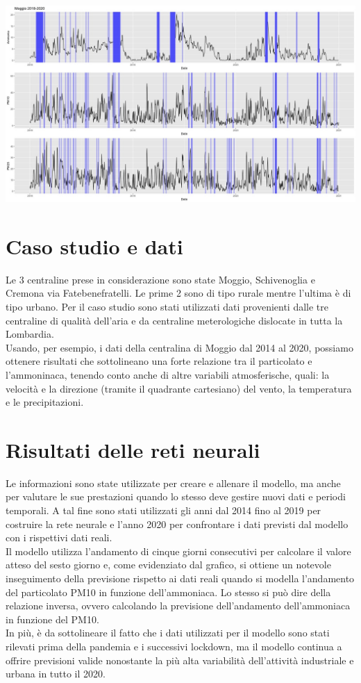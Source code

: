 \documentclass{article}
\begin{document}
\\\includegraphics[scale=0.4]{Immagini/Moggio 2018-2020.jpeg}
    
\section{Caso studio e dati}

Le 3 centraline prese in considerazione sono state Moggio, Schivenoglia e 
Cremona via Fatebenefratelli. Le prime 2 sono di tipo rurale mentre l'ultima è di tipo urbano.
Per il caso studio sono stati utilizzati dati provenienti dalle 
tre centraline di qualità dell'aria e da centraline meterologiche dislocate in tutta la Lombardia.
\\Usando, per esempio, i dati della centralina di Moggio dal 2014 al 2020, possiamo ottenere risultati 
che sottolineano una forte relazione tra il particolato e l'ammoninaca, tenendo conto anche di altre variabili
atmosferische, quali: la velocità e la direzione (tramite il quadrante cartesiano) del vento, la temperatura e le precipitazioni.
\section{Risultati delle reti neurali}
Le informazioni sono state utilizzate per creare e allenare il modello, ma anche per valutare le sue prestazioni quando lo stesso deve gestire nuovi dati e periodi temporali. A tal fine sono stati utilizzati gli anni dal 2014 fino al 2019 per costruire la rete neurale e l’anno 2020 per confrontare i dati previsti dal modello con i rispettivi dati reali.
\\Il modello utilizza l’andamento di cinque giorni consecutivi per calcolare il valore atteso del sesto giorno e, come evidenziato dal grafico, si ottiene un notevole inseguimento della previsione rispetto ai dati reali quando si modella l’andamento del particolato PM10 in funzione dell’ammoniaca. Lo stesso si può dire della relazione inversa, ovvero calcolando la previsione dell’andamento dell’ammoniaca in funzione del PM10.
\\In più, è da sottolineare il fatto che i dati utilizzati per il modello sono stati rilevati prima della pandemia e i successivi lockdown, ma il modello continua a offrire previsioni valide nonostante la più alta variabilità dell’attività industriale e urbana in tutto il 2020. 
\end{document}
